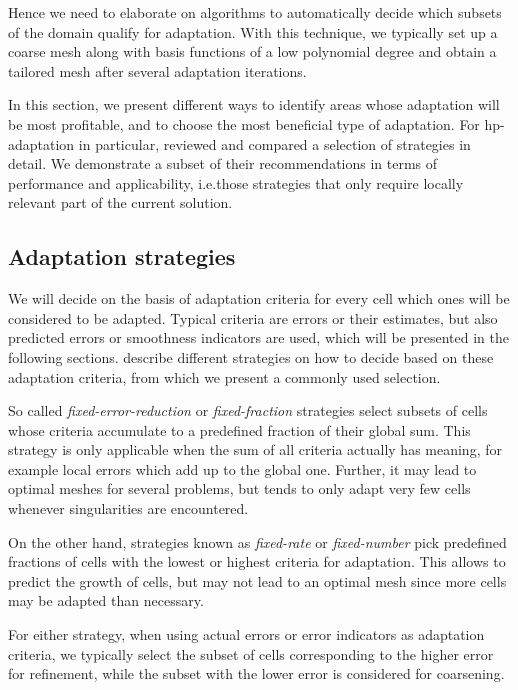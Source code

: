 Hence we need to elaborate on algorithms to automatically decide which subsets of the domain qualify for adaptation. With this technique, we typically set up a coarse mesh along with basis functions of a low polynomial degree and obtain a tailored mesh after several adaptation iterations.

In this section, we present different ways to identify areas whose adaptation will be most profitable, and to choose the most beneficial type of adaptation. For hp-adaptation in particular, \textcite{mitchell2014} reviewed and compared a selection of strategies in detail. We demonstrate a subset of their recommendations in terms of performance and applicability, i.e.\@ those strategies that only require locally relevant part of the current solution.



\subsection{Adaptation strategies}
\label{ssec:strategy}

We will decide on the basis of adaptation criteria for every cell which ones will be considered to be adapted. Typical criteria are errors or their estimates, but also predicted errors or smoothness indicators are used, which will be presented in the following sections. \textcite[Sec.~5.2]{bangerth2003} describe different strategies on how to decide based on these adaptation criteria, from which we present a commonly used selection.

So called \textit{fixed-error-reduction} or \textit{fixed-fraction} strategies select subsets of cells whose criteria accumulate to a predefined fraction of their global sum. This strategy is only applicable when the sum of all criteria actually has meaning, for example local errors which add up to the global one. Further, it may lead to optimal meshes for several problems, but tends to only adapt very few cells whenever singularities are encountered.

On the other hand, strategies known as \textit{fixed-rate} or \textit{fixed-number} pick predefined fractions of cells with the lowest or highest criteria for adaptation. This allows to predict the growth of cells, but may not lead to an optimal mesh since more cells may be adapted than necessary.

For either strategy, when using actual errors or error indicators as adaptation criteria, we typically select the subset of cells corresponding to the higher error for refinement, while the subset with the lower error is considered for coarsening.

